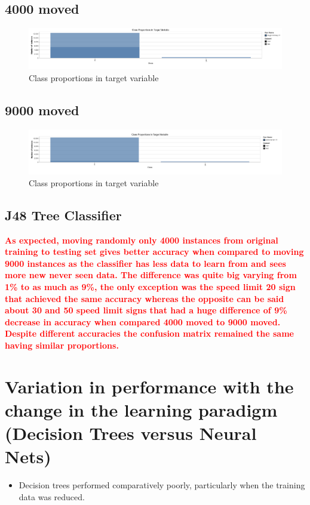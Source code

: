 \documentclass[11pt]{article}
\begin{document}
\subsection{4000 moved}
\begin{figure}[h]
  \caption {Class proportions in target variable}
  \centering 
  \includegraphics[width = \textwidth, height = 0.5\textheight, keepaspectratio]{Images/Sec1-4k.png}
\end{figure}

\subsection{9000 moved}
\begin{figure}[h]
  \caption {Class proportions in target variable}
  \centering 
  \includegraphics[width = \textwidth, height = 0.5\textheight, keepaspectratio]{Images/Sec1-9k.png}
\end{figure}
\FloatBarrier

\subsection{J48 Tree Classifier}
\textcolor{red}{\textbf{As expected, moving randomly only 4000 instances from original training to testing set gives better accuracy when compared to moving 9000 instances as the classifier has less data to learn from and sees more new never seen data. The difference was quite big varying from 1\% to as much as 9\%, the only exception was the speed limit 20 sign that achieved the same accuracy whereas the opposite can be said about 30 and 50 speed limit signs that had a huge difference of 9\% decrease in accuracy when compared 4000 moved to 9000 moved.
Despite different accuracies the confusion matrix remained the same having similar proportions.
}}

\newpage
\section{Variation in performance with the change in the learning paradigm (Decision Trees versus
Neural Nets)}
\begin{itemize}
  \item Decision trees performed comparatively poorly, particularly when the training data was reduced.
\end{itemize}
\end{document}
